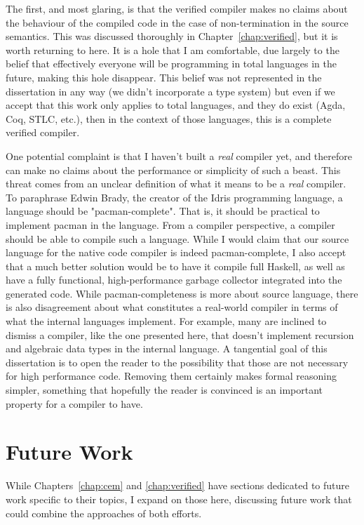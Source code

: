 The first, and most glaring, is that the verified compiler makes no claims about
the behaviour of the compiled code in the case of non-termination in the source
semantics. This was discussed thoroughly in Chapter~\ref{chap:verified}, but
it is worth returning to here. It is a hole that I am comfortable, due largely
to the belief that effectively everyone will be programming in total languages
in the future, making this hole disappear. This belief was not represented in
the dissertation in any way (we didn't incorporate a type system) but even if we
accept that this work only applies to total languages, and they do exist (Agda,
Coq, STLC, etc.), then in the context of those languages, this is a complete
verified compiler. 

One potential complaint is that I haven't built a \emph{real} compiler yet, and
therefore can make no claims about the performance or simplicity of such a
beast. This threat comes from an unclear definition of what it means to be a
\emph{real} compiler. To paraphrase Edwin Brady, the creator of the Idris
programming language, a language should be "pacman-complete". That is, it should
be practical to implement pacman in the language. From a compiler perspective, a
compiler should be able to compile such a language. While I would claim that our
source language for the native code compiler is indeed pacman-complete, 
I also accept that a much better solution would be to have it compile full
Haskell, as well as have a fully functional, high-performance garbage collector
integrated into the generated code. While pacman-completeness is more about
source language, there is also disagreement about what constitutes a real-world
compiler in terms of what the internal languages implement. For example, many
are inclined to dismiss a compiler, like the one presented here, that doesn't
implement recursion and algebraic data types in the internal language. A
tangential goal of this dissertation is to open the reader to the possibility
that those are not necessary for high performance code. Removing them certainly
makes formal reasoning simpler, something that hopefully the reader is convinced
is an important property for a compiler to have.  

\section{Future Work}\label{sec:future}

While Chapters~\ref{chap:cem} and \ref{chap:verified} have sections dedicated to
future work specific to their topics, I expand on those here, discussing future
work that could combine the approaches of both efforts. 

